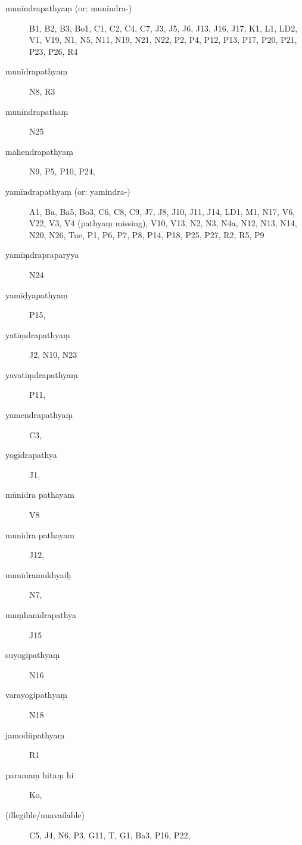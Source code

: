 \begin{ekdosis}
\begin{marma}[hp01_055]
\begin{marma}[hp01_062]
  \begin{description}
  \item[munīndrapathyaṃ (or: munindra-)] B1, B2, B3, Bo1, C1, C2, C4, C7, J3, J5, J6, J13, J16, J17, K1, L1, LD2, V1, V19, N1, N5, N11, N19, N21, N22, P2, P4, P12, P13, P17, P20, P21, P23, P26, R4
\item[munīdrapathyaṃ]   N8, R3
\item[munīndrapathaṃ]   N25
\item[mahendrapathyaṃ]  N9, P5, P10, P24, 
  \item[yamīndrapathyaṃ (or: yamindra-)] A1, Ba, Ba5, Bo3, C6, C8, C9, J7, J8, J10, J11, J14, LD1, M1, N17, V6, V22, V3, V4 (pathyaṃ missing), V10, V13, N2, N3, N4a, N12, N13, N14, N20, N26, Tue, P1, P6, P7, P8, P14, P18, P25, P27, R2, R5, P9
\item[yamīṃdrapraparyya]   N24
\item[yamīḍyapathyaṃ] P15,
\item[yatīṃdrapathyaṃ]    J2, N10, N23
\item[yavatīṃdrapathyaṃ]    P11,
\item[yamendrapathyaṃ]    C3,
\item[yogīdrapathya]    J1,     
\item[mūnidra pathayam]    V8
\item[munidra pathayam]    J12,
\item[munīdramukhyaiḥ]    N7,
\item[muṃhanīdrapathya]    J15
\item[suyogipathyaṃ]     N16
\item[varayogipathyaṃ]    N18
\item[jamodūpathyaṃ]    R1
\item[paramaṃ hitaṃ hi]    Ko,
\item[(illegible/unavailable)]   C5, J4, N6, P3, G11, T, G1, Ba3, P16, P22,
    \end{description}
 \end{marma}



\end{marma}
\end{ekdosis}
